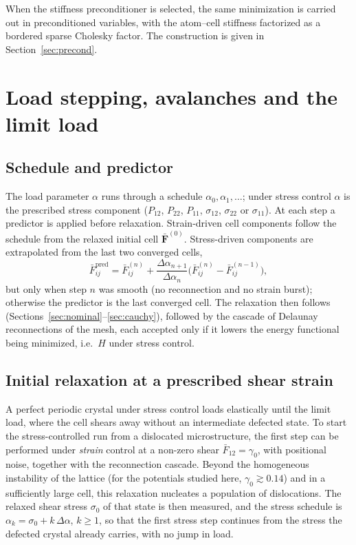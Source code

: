 \documentclass[11pt,a4paper]{article}
\newcommand{\Fb}{\bar{\mathbf F}}
\begin{document}
When the stiffness preconditioner is selected, the same minimization is carried out in
preconditioned variables, with the atom--cell stiffness factorized as a bordered sparse Cholesky
factor. The construction is given in Section~\ref{sec:precond}.

\section{Load stepping, avalanches and the limit load}
\label{sec:protocol}

\subsection{Schedule and predictor}

The load parameter \(\alpha\) runs through a schedule \(\alpha_0,\alpha_1,\dots\); under stress
control \(\alpha\) is the prescribed stress component (\(P_{12}\), \(P_{22}\), \(P_{11}\),
\(\sigma_{12}\), \(\sigma_{22}\) or \(\sigma_{11}\)). At each step a predictor is applied before
relaxation. Strain-driven cell components follow the schedule from the relaxed initial cell
\(\Fb^{(0)}\). Stress-driven components are extrapolated from the last two converged cells,
\begin{equation}
  \bar F^{\mathrm{pred}}_{ij}=\bar F_{ij}^{(n)}+\frac{\Delta\alpha_{n+1}}{\Delta\alpha_n}
  \big(\bar F_{ij}^{(n)}-\bar F_{ij}^{(n-1)}\big),
\end{equation}
but only when step \(n\) was smooth (no reconnection and no strain burst); otherwise the predictor
is the last converged cell. The relaxation then follows (Sections~\ref{sec:nominal}--\ref{sec:cauchy}),
followed by the cascade of Delaunay reconnections of the mesh, each accepted only if it lowers the
energy functional being minimized, i.e.\ \(H\) under stress control.

\subsection{Initial relaxation at a prescribed shear strain}

A perfect periodic crystal under stress control loads elastically until the limit load, where the
cell shears away without an intermediate defected state. To start the stress-controlled run from a
dislocated microstructure, the first step can be performed under \emph{strain} control at a
non-zero shear \(\bar F_{12}=\gamma_0\), with positional noise, together with the reconnection
cascade. Beyond the homogeneous instability of the lattice (for the potentials studied here,
\(\gamma_0\gtrsim0.14\)) and in a sufficiently large cell, this relaxation nucleates a population of
dislocations. The relaxed shear stress \(\sigma_0\) of that state is then measured, and the stress
schedule is \(\alpha_k=\sigma_0+k\,\Delta\alpha\), \(k\geq1\), so that the first stress step
continues from the stress the defected crystal already carries, with no jump in load.
\end{document}
